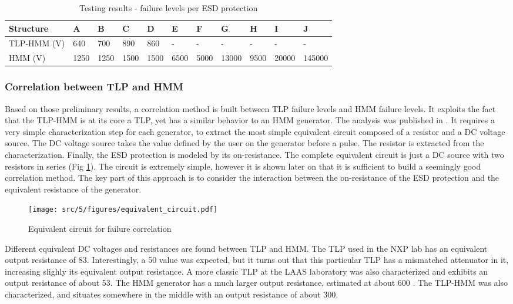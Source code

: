 \begin{table}[!h]
\centering
\begin{tabular}{@{}lllllllllll@{}}
\toprule
Structure   & A     & B     & C      & D    & E    & F    & G     & H    & I     & J      \\ \midrule
TLP-HMM (V) & 640   & 700   & 890    & 860  & -    & -    & -     & -    & -     & -      \\
HMM     (V) & 1250  & 1250  & 1500   & 1500 & 6500 & 5000 & 13000 & 9500 & 20000 & 145000 \\
\end{tabular}
\caption{Testing results - failure levels per ESD protection}
\label{tab:esd-protections}
\end{table}

\subsubsection{Correlation between TLP and HMM}

Based on those preliminary results, a correlation method is built between TLP failure levels and HMM failure levels.
It exploits the fact that the TLP-HMM is at its core a TLP, yet has a similar behavior to an HMM generator.
The analysis was published in \cite{my-publi-tlp-hmm}.
It requires a very simple characterization step for each generator, to extract the most simple equivalent circuit composed of a resistor and a DC voltage source.
The DC voltage source takes the value defined by the user on the generator before a pulse.
The resistor is extracted from the characterization.
Finally, the ESD protection is modeled by its on-resistance.
The complete equivalent circuit is just a DC source with two resistors in series (Fig \ref{fig:simple_equivalent_circuit}).
The circuit is extremely simple, however it is shown later on that it is sufficient to build a seemingly good correlation method.
The key part of this approach is to consider the interaction between the on-resistance of the ESD protection and the equivalent resistance of the generator.

\begin{figure}[!h]
  \centering
  \texttt{[image: src/5/figures/equivalent\_circuit.pdf]}
  \caption{Equivalent circuit for failure correlation}
  \label{fig:simple_equivalent_circuit}
\end{figure}

Different equivalent DC voltages and resistances are found between TLP and HMM.
The TLP used in the NXP lab has an equivalent output resistance of 83\textOmega{}.
Interestingly, a 50\textOmega{} value was expected, but it turns out that this particular TLP has a mismatched attenuator in it, increasing slighly its equivalent output resistance.
A more classic TLP at the LAAS laboratory was also characterized and exhibits an output resistance of about 53\textOmega{}.
The HMM generator has a much larger output resistance, estimated at about 600 \textOmega{}.
The TLP-HMM was also characterized, and situates somewhere in the middle with an output resistance of about 300\textOmega{}.


